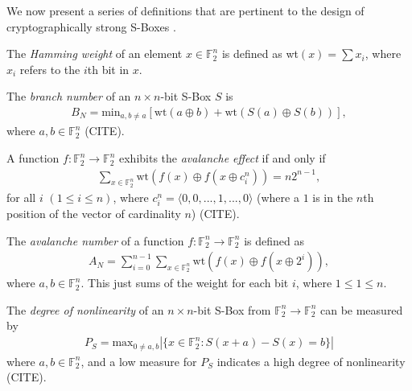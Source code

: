 \documentclass[11pt]{article}
\newcommand{\field}[1]{\mathbb{#1}} %
\begin{document}
We now present a series of definitions that are pertinent to the design of cryptographically strong S-Boxes \cite{Mar_newanalysis}.


\begin{define}
The \emph{Hamming weight} of an element $x \in \field{F}_2^n$ is defined as wt$(x) = \sum x_i$, where $x_i$ refers to the $i$th bit in $x$.
\end{define}

\begin{define}
The \emph{branch number} of an $n \times n$-bit S-Box $S$ is
\begin{eqnarray}
B_N = \text{min}_{a, b\not=a}\left[\text{wt}(a \oplus b) + \text{wt}(S(a) \oplus S(b))\right],
\end{eqnarray}
where $a, b \in \field{F}_2^n$ (CITE).
\end{define}

\begin{define}
A function $f : \field{F}_2^n \to \field{F}_2^n$ exhibits the \emph{avalanche effect} if and only if 
\begin{eqnarray}
\sum_{x \in \field{F}_2^n} \text{wt}(f(x) \oplus f(x \oplus c_{i}^{n})) = n2^{n-1},
\end{eqnarray}
for all $i$ $(1 \leq i \leq n)$, where $c_{i}^{n} = \langle 0, 0, ..., 1, ..., 0 \rangle$ (where a $1$ is in the $n$th position of the vector of cardinality $n$) (CITE).
\end{define}

\begin{define}
The \emph{avalanche number} of a function $f : \field{F}_2^n \to \field{F}_2^n$ is defined as
\begin{eqnarray}
A_N = \sum_{i = 0}^{n - 1}\sum_{x \in \field{F}_2^n} \text{wt}(f(x) \oplus f(x \oplus 2^{i})),
\end{eqnarray}
where $a, b \in \field{F}_2^n$. This just sums of the weight for each bit $i$, where $1 \leq 1 \leq n$.
\end{define}

\begin{define}
The \emph{degree of nonlinearity} of an $n \times n$-bit S-Box from $\field{F}_2^n \to \field{F}_2^n$ can be measured by
\begin{eqnarray}
	P_S = \text{max}_{0 \not= a, b}|\{x \in \field{F}_2^n : S(x + a) - S(x) = b\}|
\end{eqnarray}
where $a, b \in \field{F}_2^n$, and a low measure for $P_S$ indicates a high degree of nonlinearity (CITE).
\end{define}
\end{document}
